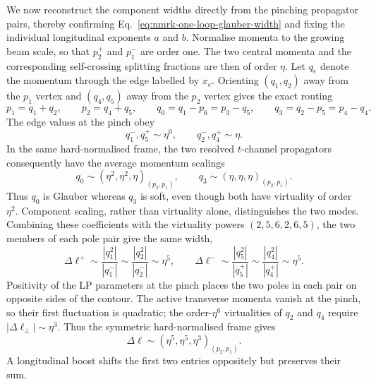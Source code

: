 \documentclass[a4paper,11pt]{article}
\begin{document}
We now reconstruct the component widths directly from the pinching propagator
pairs, thereby confirming Eq.~\eqref{eq:nmrk-one-loop-glauber-width} and fixing
the individual longitudinal exponents \(a\) and \(b\).  Normalise momenta to
the growing beam scale, so that
\(p_2^+\) and \(p_1^-\) are order one.  The two central momenta and the
corresponding self-crossing splitting fractions are then of order \(\eta\).
Let \(q_e\) denote the momentum through the edge labelled by \(x_e\).
Orienting \((q_1,q_2)\) away from the \(p_1\) vertex and
\((q_4,q_5)\) away from the \(p_2\) vertex gives the exact routing
\[
 p_1=q_1+q_2,\qquad p_2=q_4+q_5,\qquad
 q_0=q_1-p_6=p_3-q_5,\qquad
 q_3=q_2-p_5=p_4-q_4.
\]
The edge values at the pinch obey
\begin{equation}
 q_1^-,q_5^+\sim\eta^0,
 \qquad q_2^-,q_4^+\sim\eta.
 \label{eq:nmrk-pinched-longitudinal-components}
\end{equation}
In the same hard-normalised frame, the two resolved \(t\)-channel
propagators consequently have the average momentum scalings
\begin{equation}
 q_0\sim(\eta^2,\eta^2,\eta)_{(p_2,p_1)},\qquad
 q_3\sim(\eta,\eta,\eta)_{(p_2,p_1)}.
 \label{eq:nmrk-resolved-transfer-values}
\end{equation}
Thus \(q_0\) is Glauber whereas \(q_3\) is soft, even though both have
virtuality of order \(\eta^2\).  Component scaling, rather than virtuality
alone, distinguishes the two modes.
Combining these coefficients with the virtuality powers
\((2,5,6,2,6,5)\), the two members of each pole pair give the same width,
\begin{equation}
 \Delta\ell^+\sim
 \frac{|q_1^2|}{|q_1^-|}\sim
 \frac{|q_2^2|}{|q_2^-|}\sim\eta^5,
 \qquad
 \Delta\ell^-\sim
 \frac{|q_5^2|}{|q_5^+|}\sim
 \frac{|q_4^2|}{|q_4^+|}\sim\eta^5.
 \label{eq:nmrk-longitudinal-pole-widths}
\end{equation}
Positivity of the LP parameters at the pinch places the two poles in each pair on
opposite sides of the contour.  The active transverse momenta vanish at the
pinch, so their first fluctuation is quadratic; the order-\(\eta^6\)
virtualities of \(q_2\) and \(q_4\) require
\(|\Delta\ell_\perp|\sim\eta^3\).  Thus the symmetric hard-normalised frame
gives
\begin{equation}
 \Delta\ell\sim(\eta^5,\eta^5,\eta^3)_{(p_2,p_1)}.
 \label{eq:nmrk-direct-pole-widths}
\end{equation}
A longitudinal boost shifts the first two entries oppositely but preserves
their sum.
\end{document}
